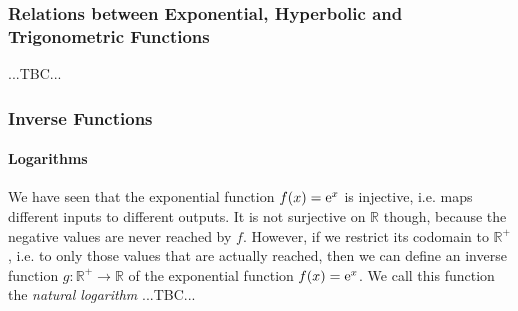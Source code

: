 













\subsubsection{Relations between Exponential, Hyperbolic and Trigonometric Functions}

...TBC...



\subsubsection{Inverse Functions}

\paragraph{Logarithms}
We have seen that the exponential function $f(x) = \operatorname{\mathrm{e}}^x$ is injective, i.e. maps different inputs to different outputs. It is not surjective on $\mathbb{R}$ though, because the negative values are never reached by $f$. However, if we restrict its codomain to $\mathbb{R}^+$, i.e. to only those values that are actually reached, then we can define an inverse function $g: \mathbb{R}^+ \rightarrow \mathbb{R}$ of the exponential function $f(x) = \operatorname{\mathrm{e}}^x$. We call this function the \emph{natural logarithm} ...TBC...

